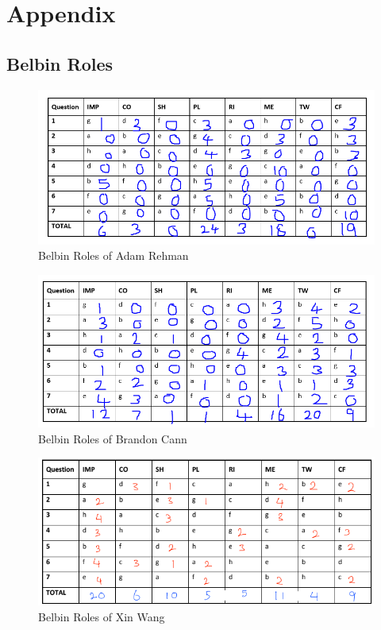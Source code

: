 \documentclass[12pt,a4paper]{article}
\begin{document}
\pagebreak
\section{Appendix}
\subsection{Belbin Roles}
\begin{figure} [h!]
	\centering
	\includegraphics[scale=0.5]{Adam.PNG}
	\caption{Belbin Roles of Adam Rehman}
\end{figure}
\begin{figure} [h!]
	\centering
	\includegraphics[scale=0.5]{Brandon.PNG}
	\caption{Belbin Roles of Brandon Cann}
\end{figure}
\begin{figure} [h!]
	\centering
	\includegraphics[scale=0.75]{Xin.PNG}
	\caption{Belbin Roles of Xin Wang}
\end{figure}
\pagebreak
\end{document}
